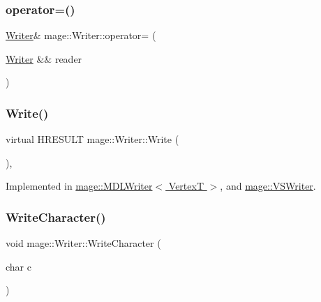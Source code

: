 \hypertarget{classmage_1_1_writer_aacbdb763abf79c5753b89bd336f56ea3}{}\label{classmage_1_1_writer_aacbdb763abf79c5753b89bd336f56ea3} 
\subsubsection{\texorpdfstring{operator=()}{operator=()}\hspace{0.1cm}{\footnotesize\ttfamily [2/2]}}
{\footnotesize\ttfamily \hyperlink{classmage_1_1_writer}{Writer}\& mage\+::\+Writer\+::operator= (\begin{DoxyParamCaption}\item[{\hyperlink{classmage_1_1_writer}{Writer} \&\&}]{reader }\end{DoxyParamCaption})\hspace{0.3cm}{\ttfamily [delete]}}

\hypertarget{classmage_1_1_writer_a7ef124095098e7ea8f95e3be16499be3}{}\label{classmage_1_1_writer_a7ef124095098e7ea8f95e3be16499be3} 
\subsubsection{\texorpdfstring{Write()}{Write()}}
{\footnotesize\ttfamily virtual H\+R\+E\+S\+U\+LT mage\+::\+Writer\+::\+Write (\begin{DoxyParamCaption}{ }\end{DoxyParamCaption})\hspace{0.3cm}{\ttfamily [private]}, {}}



Implemented in \hyperlink{classmage_1_1_m_d_l_writer_abd4f206b457d8b97e6e38e25f7e88ed3}{mage\+::\+M\+D\+L\+Writer$<$ Vertex\+T $>$}, and \hyperlink{classmage_1_1_v_s_writer_a1d106607f69bbd5989a259bbf60262fb}{mage\+::\+V\+S\+Writer}.

\hypertarget{classmage_1_1_writer_aa1ef04f5e69c44afda56704c2823316c}{}\label{classmage_1_1_writer_aa1ef04f5e69c44afda56704c2823316c} 
\subsubsection{\texorpdfstring{Write\+Character()}{WriteCharacter()}}
{\footnotesize\ttfamily void mage\+::\+Writer\+::\+Write\+Character (\begin{DoxyParamCaption}\item[{char}]{c }\end{DoxyParamCaption})\hspace{0.3cm}{\ttfamily [protected]}}

